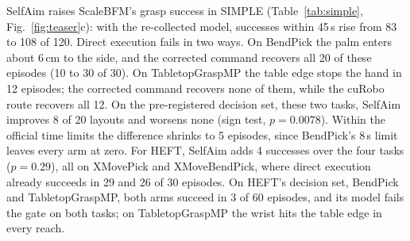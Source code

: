 \documentclass[conference]{IEEEtran}
\begin{document}
SelfAim raises ScaleBFM's grasp success in SIMPLE (Table~\ref{tab:simple}, Fig.~\ref{fig:teaser}c): with the re-collected model, successes within 45\,s rise from 83 to 108 of 120. Direct execution fails in two ways. On BendPick the palm enters about 6\,cm to the side, and the corrected command recovers all 20 of these episodes (10 to 30 of 30). On TabletopGraspMP the table edge stops the hand in 12 episodes; the corrected command recovers none of them, while the cuRobo route recovers all 12. On the pre-registered decision set, these two tasks, SelfAim improves 8 of 20 layouts and worsens none (sign test, $p=0.0078$). Within the official time limits the difference shrinks to 5 episodes, since BendPick's 8\,s limit leaves every arm at zero. For HEFT, SelfAim adds 4 successes over the four tasks ($p=0.29$), all on XMovePick and XMoveBendPick, where direct execution already succeeds in 29 and 26 of 30 episodes. On HEFT's decision set, BendPick and TabletopGraspMP, both arms succeed in 3 of 60 episodes, and its model fails the gate on both tasks; on TabletopGraspMP the wrist hits the table edge in every reach.
\end{document}
